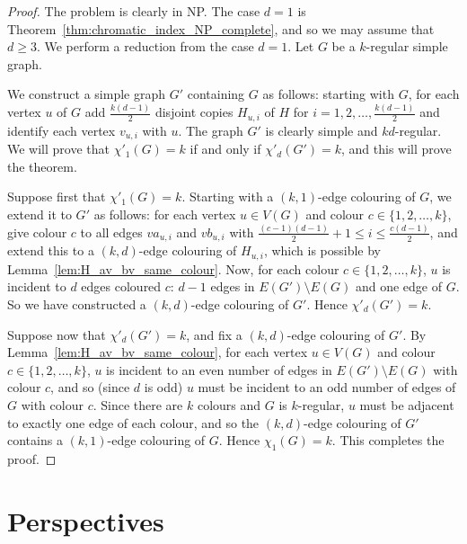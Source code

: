 \begin{proof}
The problem is clearly in NP. The case $d = 1$ is Theorem~\ref{thm:chromatic_index_NP_complete}, and so we may assume that $d \geq 3$. We perform a reduction from the case $d = 1$. Let $G$ be a $k$-regular simple graph.

We construct a simple graph $G'$ containing $G$ as follows: starting with $G$, for each vertex $u$ of $G$ add $\frac{k(d-1)}{2}$ disjoint copies $H_{u,i}$ of $H$ for $i = 1,2, \dots, \frac{k(d-1)}{2}$ and identify each vertex $v_{u,i}$ with $u$. The graph $G'$ is clearly simple and $kd$-regular. We will prove that $\chi'_{1}(G) = k$ if and only if $\chi'_d(G') = k$, and this will prove the theorem.

Suppose first that $\chi'_1(G) = k$. Starting with a $(k,1)$-edge colouring of $G$, we extend it to $G'$ as follows: for each vertex $u \in V(G)$ and colour $c \in \{ 1, 2, \dots, k\}$, give colour $c$ to all edges $va_{u,i}$ and $vb_{u,i}$ with $\frac{(c-1)(d-1)}{2} + 1 \leq i \leq \frac{c(d-1)}{2}$, and extend this to a $(k,d)$-edge colouring of $H_{u,i}$, which is possible by Lemma~\ref{lem:H_av_bv_same_colour}. 
Now, for each colour $c \in \{1, 2, \dots, k\}$, $u$ is incident to $d$ edges coloured $c$: $d-1$ edges in $E(G') \setminus E(G)$ and one edge of $G$. So we have constructed a $(k,d)$-edge colouring of $G'$. Hence $\chi'_d(G') = k$.

Suppose now that $\chi'_d(G') = k$, and fix a $(k,d)$-edge colouring of $G'$. By Lemma~\ref{lem:H_av_bv_same_colour}, for each vertex $u \in V(G)$ and colour $c \in \{1,2,\dots,k\}$, $u$ is incident to an even number of edges in $E(G') \setminus E(G)$ with colour $c$, and so (since $d$ is odd) $u$ must be incident to an odd number of edges of $G$ with colour $c$. Since there are $k$ colours and $G$ is $k$-regular, $u$ must be adjacent to exactly one edge of each colour, and so the $(k,d)$-edge colouring of $G'$ contains a $(k,1)$-edge colouring of $G$. Hence $\chi_1(G) = k$. This completes the proof.

\end{proof}










\section{Perspectives}\label{sec:further}

